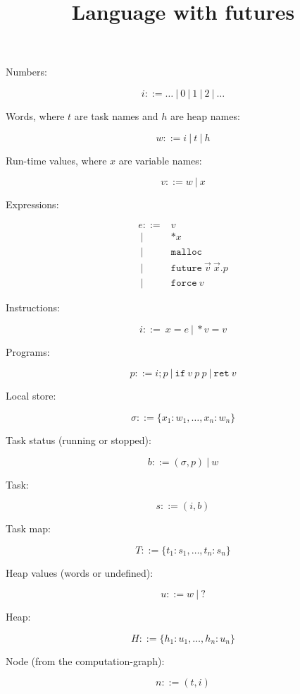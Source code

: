 \documentclass{article}
\title{Language with futures}
\date{}
\newcommand{\Prog}{p}
\newcommand{\Word}{w}
\newcommand{\Val}{v}
\newcommand{\HeapMap}{H}
\newcommand{\TaskMap}{T}
\newcommand{\Task}{s}
\newcommand{\TName}{t}
\newcommand{\HName}{h}
\newcommand{\Inst}{i}
\newcommand{\RET}[1][\Val]{\mathtt{ret}\ {#1}}
\newcommand{\Var}{x}
\newcommand{\Exp}{e}
\newcommand{\Deref}[1][\Var]{*{#1}}
\newcommand{\Nat}{i}
\newcommand{\Malloc}{\mathtt{malloc}}
\newcommand{\Future}[3]{\mathtt{future}\ {#1}\ {#2}.{#3}}
\newcommand{\Force}[1][\Val]{\mathtt{force}\ {#1}}
\newcommand{\If}[3][\Val]{\mathtt{if}\ {#1}\ {#2}\ {#3}}
\newcommand{\TStatus}{b}
\newcommand{\HeapVal}{u}
\newcommand{\Node}{n}
\newcommand{\grmor}{|}
\newcommand{\Grmor}{\ \grmor\ }
\newcommand{\Grmeq}{::=}
\begin{document}
\maketitle

Numbers:

$$
\Nat \Grmeq \dots \Grmor 0 \Grmor 1 \Grmor 2 \Grmor \dots
$$

Words, where $\TName$ are task names and $\HName$ are heap names:

$$
\Word \Grmeq \Nat \Grmor \TName \Grmor \HName
$$

Run-time values, where $\Var$ are variable names:

$$
\Val \Grmeq \Word \Grmor \Var
$$

Expressions:

$$
\begin{aligned}
\Exp    \Grmeq & \Val  \\
        \Grmor & \Deref \\
        \Grmor & \Malloc \\
        \Grmor & \Future {\vec \Val}  {\vec \Var} \Prog \\
        \Grmor & \Force 
\end{aligned}
$$

Instructions:

$$
\Inst   ::=\  \Var = \Exp \ |\ * \Val = \Val 
$$

Programs:

$$
\Prog ::= \Inst; \Prog \ |\ \If \Prog \Prog \ |\ \RET
$$

Local store:

$$
\sigma ::= \{\Var_1:\Word_1,\dots,\Var_n:\Word_n\}
$$

Task status (running or stopped):

$$
\TStatus \Grmeq (\sigma, \Prog) \Grmor \Word
$$

Task:

$$
\Task \Grmeq (\Nat,\TStatus)
$$

Task map:

$$
\TaskMap ::= \{\TName_1:\Task_1,\dots,\TName_n:\Task_n\}
$$

Heap values (words or undefined):

$$
\HeapVal \Grmeq \Word \Grmor ?
$$

Heap:

$$
\HeapMap ::= \{\HName_1\colon \HeapVal_1,\dots,\HName_n\colon \HeapVal_n\}
$$

Node (from the computation-graph):

$$
\Node \Grmeq (\TName,\Nat)
$$
\end{document}
